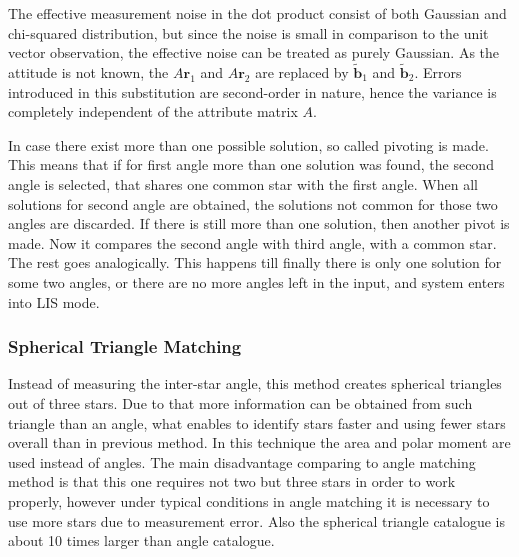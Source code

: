 \documentclass[12pt,a4paper,twoside]{article}
\begin{document}
The effective measurement noise in the dot product consist of both Gaussian and chi-squared distribution, but since the noise is small in comparison to the unit vector observation, the effective noise can be treated as purely Gaussian. As the attitude is not known, the $A\bm{r}_1$ and $A\bm{r}_2$ are replaced by $\tilde{\bm{b}}_1$ and $\tilde{\bm{b}}_2$. Errors introduced in this substitution are second-order in nature, hence the variance is completely independent of the attribute matrix $A$.

In case there exist more than one possible solution, so called pivoting is made. This means that if for first angle more than one solution was found, the second angle is selected, that shares one common star with the first angle. When all solutions for second angle are obtained, the solutions not common for those two angles are discarded. If there is still more than one solution, then another pivot is made. Now it compares the second angle with third angle, with a common star. The rest goes analogically. This happens till finally there is only one solution for some two angles, or there are no more angles left in the input, and system enters into LIS mode.

\subsubsection{Spherical Triangle Matching}

Instead of measuring the inter-star angle, this method creates spherical triangles out of three stars. Due to that more information can be obtained from such triangle than an angle, what enables to identify stars faster and using fewer stars overall than in previous method. In this technique the area and polar moment are used instead of angles. The main disadvantage comparing to angle matching method is that this one requires not two but three stars in order to work properly, however under typical conditions in angle matching it is necessary to use more stars due to measurement error. Also the spherical triangle catalogue is about 10 times larger than angle catalogue\cite{cole2004fast}.
\end{document}
